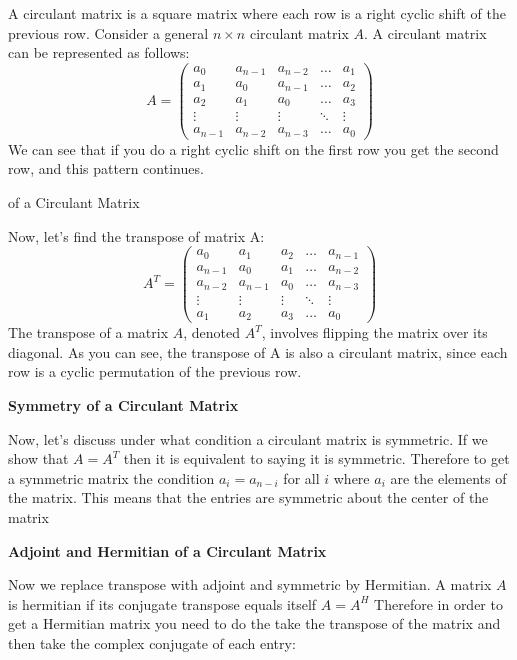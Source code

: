 \documentclass[8pt]{article}
\begin{document}
{A circulant matrix is a square matrix where each row is a right cyclic shift of the
previous row. Consider a general $n \times n$ circulant matrix $A$. A circulant matrix can be represented as follows:
\begin{equation}
A = \begin{pmatrix}
a_0 & a_{n-1} & a_{n-2} & \ldots & a_1 \\
a_1 & a_0 & a_{n-1} & \ldots & a_2 \\
a_2 & a_1 & a_0 & \ldots & a_3 \\
\vdots & \vdots & \vdots & \ddots & \vdots \\
a_{n-1} & a_{n-2} & a_{n-3} & \ldots & a_0
\end{pmatrix}
\end{equation}
We can see that if you do a right cyclic shift on the first row you get the second
row, and this pattern continues.

\textbfTranspose of a Circulant Matrix}
Now, let’s find the transpose of matrix A:
\begin{equation}
A^T = \begin{pmatrix}
a_0 & a_1 & a_2 & \ldots & a_{n-1} \\
a_{n-1} & a_0 & a_1 & \ldots & a_{n-2} \\
a_{n-2} & a_{n-1} & a_0 & \ldots & a_{n-3} \\
\vdots & \vdots & \vdots & \ddots & \vdots \\
a_1 & a_2 & a_3 & \ldots & a_0
\end{pmatrix}
\end{equation}
The transpose of a matrix $A$, denoted $A^T$, involves flipping the matrix over its diagonal. As you can see, the transpose of A is also a circulant matrix, since each row is a cyclic permutation of the previous row.

\textbf{Symmetry of a Circulant Matrix}

Now, let’s discuss under what condition a circulant matrix is symmetric. If we
show that $A = A^T$ then it is equivalent to saying it is symmetric. Therefore to
get a symmetric matrix the condition $a_i = a_{n-i}$ for all $i$ where $a_i$ are the elements of the matrix. This means that the entries are symmetric about the center of the matrix

\textbf{Adjoint and Hermitian of a Circulant Matrix}

Now we replace transpose with adjoint and symmetric by Hermitian. A matrix
$A$ is hermitian if its conjugate transpose equals itself $A = A^H$ Therefore in order
to get a Hermitian matrix you need to do the take the transpose of the matrix and then take the complex conjugate of each entry:
\end{document}
